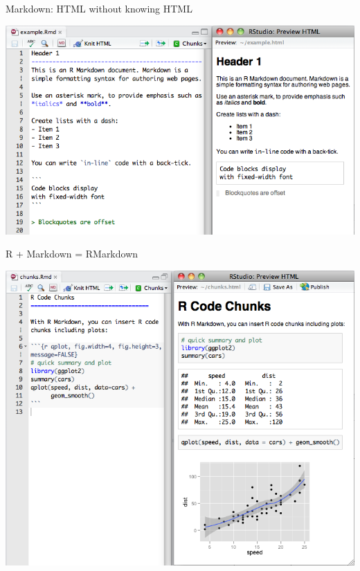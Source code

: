 \documentclass{beamer}\usepackage[]{graphicx}\usepackage[]{color}
\begin{document}
\begin{frame}{Markdown: HTML without knowing HTML}
	\begin{center}
		\includegraphics[scale=0.45, keepaspectratio]{figure/markdown}
	\end{center}
\end{frame}

\begin{frame}{R + Markdown = RMarkdown}
	\begin{center}
		\includegraphics[scale=0.36, keepaspectratio]{figure/rmarkdown}
	\end{center}
\end{frame}
\end{document}
